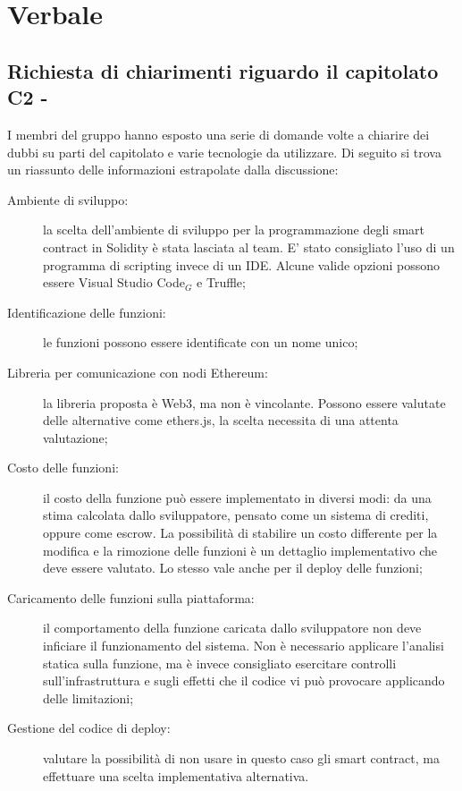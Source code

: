 \section{Verbale}
\subsection{Richiesta di chiarimenti riguardo il capitolato C2 - \NomeProgetto}
I membri del gruppo hanno esposto una serie di domande volte a chiarire dei dubbi su parti del capitolato e varie tecnologie da utilizzare.
Di seguito si trova un riassunto delle informazioni estrapolate dalla discussione:
\begin{description}
	\item[Ambiente di sviluppo:] la scelta dell'ambiente di sviluppo per la programmazione degli smart contract in Solidity è stata lasciata al team. E' stato consigliato l'uso di un programma di scripting invece di un IDE. Alcune valide opzioni possono essere Visual Studio Code$_{G}$ e Truffle;
	\item[Identificazione delle funzioni:] le funzioni possono essere identificate con un nome unico;
	\item[Libreria per comunicazione con nodi Ethereum:] la libreria proposta è Web3, ma non è vincolante. Possono essere valutate delle alternative come ethers.js, la scelta necessita di una attenta valutazione;
	\item[Costo delle funzioni:] il costo della funzione può essere implementato in diversi modi: da una stima calcolata dallo sviluppatore, pensato come un sistema di crediti, oppure come escrow. La possibilità di stabilire un costo differente per la modifica e la rimozione delle funzioni è un  dettaglio implementativo che deve essere valutato. Lo stesso vale anche per il deploy delle funzioni;
	\item[Caricamento delle funzioni sulla piattaforma:] il comportamento della funzione caricata dallo sviluppatore non deve inficiare il funzionamento del sistema. Non è necessario applicare l'analisi statica sulla funzione, ma è invece consigliato esercitare controlli sull'infrastruttura e sugli effetti che il codice vi può provocare applicando delle limitazioni;
	\item[Gestione del codice di deploy:] valutare la possibilità di non usare in questo caso gli smart contract, ma effettuare una scelta implementativa alternativa.
\end{description}

